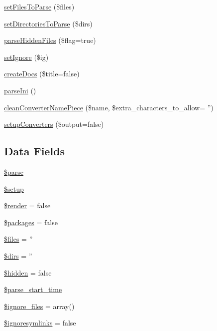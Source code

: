 \begin{DoxyCompactItemize}
\item 
\hyperlink{classphp_documentor__setup_a49d20ee086ae88a21e04defc0e0c7342}{set\-Files\-To\-Parse} (\$files)
\item 
\hyperlink{classphp_documentor__setup_a7bb2c59218045e8402f086002a83610a}{set\-Directories\-To\-Parse} (\$dirs)
\item 
\hyperlink{classphp_documentor__setup_aa9ba6adca8f63c2298cf6e52d072e69b}{parse\-Hidden\-Files} (\$flag=true)
\item 
\hyperlink{classphp_documentor__setup_a21e1c6d9cc1ecc130837bbd8385cf969}{set\-Ignore} (\$ig)
\item 
\hyperlink{classphp_documentor__setup_a588ed13857862d642c56049230643f20}{create\-Docs} (\$title=false)
\item 
\hyperlink{classphp_documentor__setup_a01932a8b3605859bb81501a8e0d35c53}{parse\-Ini} ()
\item 
\hyperlink{classphp_documentor__setup_ad8d92aaef91bf1f93103f60323160b7c}{clean\-Converter\-Name\-Piece} (\$name, \$extra\-\_\-characters\-\_\-to\-\_\-allow= '')
\item 
\hyperlink{classphp_documentor__setup_a33f03f493dc5eb0a58977a3a63bf40cd}{setup\-Converters} (\$output=false)
\end{DoxyCompactItemize}
\subsection*{\-Data \-Fields}
\begin{DoxyCompactItemize}
\item 
\hyperlink{classphp_documentor__setup_afe6e95f01317311a80491b145e647d8b}{\$parse}
\item 
\hyperlink{classphp_documentor__setup_af50a8fd8e98752ae9a55e4ac9b1be96e}{\$setup}
\item 
\hyperlink{classphp_documentor__setup_a05fdc1afd38b444148d38a2738aada33}{\$render} = false
\item 
\hyperlink{classphp_documentor__setup_a3140ce1c96c0b7043555f663eec9e23b}{\$packages} = false
\item 
\hyperlink{classphp_documentor__setup_a9590b15215a21e9b42eb546aeef79704}{\$files} = ''
\item 
\hyperlink{classphp_documentor__setup_a1b709c1d79631ebc8320b41bda028b54}{\$dirs} = ''
\item 
\hyperlink{classphp_documentor__setup_a4a374564d2858d8ae869a8fb890aad56}{\$hidden} = false
\item 
\hyperlink{classphp_documentor__setup_aa508e51b1e1b788525c906e288cc89e9}{\$parse\-\_\-start\-\_\-time}
\item 
\hyperlink{classphp_documentor__setup_a67c9fe86936493085f0f1ceadf36427c}{\$ignore\-\_\-files} = array()
\item 
\hyperlink{classphp_documentor__setup_ac3d405f8eed9ba79b53382deafcf2ce8}{\$ignoresymlinks} = false
\end{DoxyCompactItemize}


